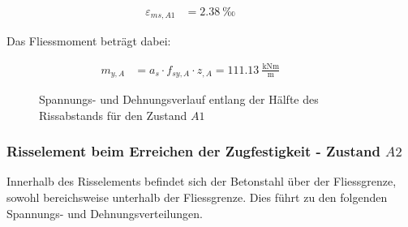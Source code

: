 \documentclass[
  11pt,
  letterpaper,
]{scrreprt}
\begin{document}
\[
\begin{aligned}
\varepsilon_{m s , A1}& = 2.38 \ \mathrm{‰} \quad &  \quad &  
 \end{aligned}
\]

Das Fliessmoment beträgt dabei:

\[
\begin{aligned}
m_{y , A}& = a_{s} \cdot f_{sy , A} \cdot z_{, A} = 111.13 \ \frac{\mathrm{kNm}}{\mathrm{m}} \quad &  \quad &  
 \end{aligned}
\]

\begin{figure}[H]

\begin{minipage}{0.50\linewidth}



\end{minipage}%
%
\begin{minipage}{0.50\linewidth}



\end{minipage}%

\caption{\label{fig-jag_zustand_a1}Spannungs- und Dehnungsverlauf
entlang der Hälfte des Rissabstands für den Zustand \(A1\)}

\end{figure}%

\subsubsection{\texorpdfstring{Risselement beim Erreichen der
Zugfestigkeit - Zustand
\(A2\)}{Risselement beim Erreichen der Zugfestigkeit - Zustand A2}}\label{risselement-beim-erreichen-der-zugfestigkeit---zustand-a2}

Innerhalb des Risselements befindet sich der Betonstahl über der
Fliessgrenze, sowohl bereichsweise unterhalb der Fliessgrenze. Dies
führt zu den folgenden Spannungs- und Dehnungsverteilungen.
\end{document}
